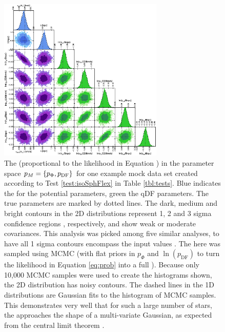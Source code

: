 
\begin{figure}
\centering
\includegraphics[width=0.7\textwidth]{figs/isoSphFlex_short_hot_2kpc_triangle_MCMC.eps}
\caption{The \pdf{} (proportional to the likelihood in Equation \Wilma{[TO DO]}) in the parameter space $p_M{} = \{p_\Phi,p_\text{DF}\}$ for one example mock data set created according to Test \ref{test:isoSphFlex} in Table \ref{tbl:tests}. Blue indicates the \pdf{} for the potential parameters, green the qDF parameters. The true parameters are marked by dotted lines. The dark, medium and bright contours in the 2D distributions represent 1, 2 and 3 sigma confidence regions , respectively, and show weak or moderate covariances. This analysis was picked among five similar analyses, to have all 1 sigma contours encompass the input values . The \pdf{} here was sampled using MCMC (with flat priors in $p_\Phi$ and  $\ln(p_\text{DF})$ to turn the likelihood in Equation \ref{eq:prob} into a full \pdf{}). Because only 10,000 MCMC samples were used to create the histograms shown, the 2D distribution has noisy contours. The dashed lines in the 1D distributions are Gaussian fits to the histogram of MCMC samples. This demonstrates very well that for such a large number of stars, the \pdf{} approaches the shape of a multi-variate Gaussian, as expected from the central limit theorem . }
\label{fig:isoSphFlex_triangleplot}
\end{figure}

